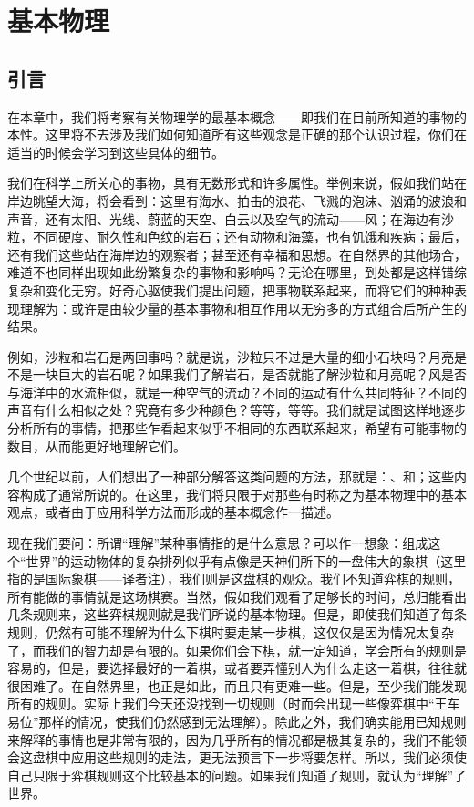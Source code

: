 \chapter{基本物理}

\section{引言}

在本章中，我们将考察有关物理学的最基本概念——即我们在目前所知道的事物的本性。这里将不去涉及我们如何知道所有这些观念是正确的那个认识过程，你们在适当的时候会学习到这些具体的细节。

我们在科学上所关心的事物，具有无数形式和许多属性。举例来说，假如我们站在岸边眺望大海，将会看到：这里有海水、拍击的浪花、飞溅的泡沫、汹涌的波浪和声音，还有太阳、光线、蔚蓝的天空、白云以及空气的流动——风；在海边有沙粒，不同硬度、耐久性和色纹的岩石；还有动物和海藻，也有饥饿和疾病；最后，还有我们这些站在海岸边的观察者；甚至还有幸福和思想。在自然界的其他场合，难道不也同样出现如此纷繁复杂的事物和影响吗？无论在哪里，到处都是这样错综复杂和变化无穷。好奇心驱使我们提出问题，把事物联系起来，而将它们的种种表现理解为：或许是由较少量的基本事物和相互作用以无穷多的方式组合后所产生的结果。

例如，沙粒和岩石是两回事吗？就是说，沙粒只不过是大量的细小石块吗？月亮是不是一块巨大的岩石呢？如果我们了解岩石，是否就能了解沙粒和月亮呢？风是否与海洋中的水流相似，就是一种空气的流动？不同的运动有什么共同特征？不同的声音有什么相似之处？究竟有多少种颜色？等等，等等。我们就是试图这样地逐步分析所有的事情，把那些乍看起来似乎不相同的东西联系起来，希望有可能事物的数目，从而能更好地理解它们。

几个世纪以前，人们想出了一种部分解答这类问题的方法，那就是：、和；这些内容构成了通常所说的。在这里，我们将只限于对那些有时称之为基本物理中的基本观点，或者由于应用科学方法而形成的基本概念作一描述。

现在我们要问：所谓“理解”某种事情指的是什么意思？可以作一想象：组成这个“世界”的运动物体的复杂排列似乎有点像是天神们所下的一盘伟大的象棋（这里指的是国际象棋——译者注），我们则是这盘棋的观众。我们不知道弈棋的规则，所有能做的事情就是这场棋赛。当然，假如我们观看了足够长的时间，总归能看出几条规则来，这些弈棋规则就是我们所说的基本物理。但是，即使我们知道了每条规则，仍然有可能不理解为什么下棋时要走某一步棋，这仅仅是因为情况太复杂了，而我们的智力却是有限的。如果你们会下棋，就一定知道，学会所有的规则是容易的，但是，要选择最好的一着棋，或者要弄懂别人为什么走这一着棋，往往就很困难了。在自然界里，也正是如此，而且只有更难一些。但是，至少我们能发现所有的规则。实际上我们今天还没找到一切规则（时而会出现一些像弈棋中“王车易位”那样的情况，使我们仍然感到无法理解）。除此之外，我们确实能用已知规则来解释的事情也是非常有限的，因为几乎所有的情况都是极其复杂的，我们不能领会这盘棋中应用这些规则的走法，更无法预言下一步将要怎样。所以，我们必须使自己只限于弈棋规则这个比较基本的问题。如果我们知道了规则，就认为“理解”了世界。

